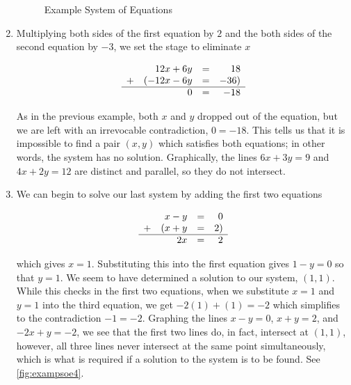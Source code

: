 \begin{ex}
\begin{enumerate}
\begin{figure}
\begin{center}
\begin{tabular}{m{0.5\linewidth}m{0.5\linewidth}}
\\

\end{tabular}

\caption{Example System of Equations}
\label{fig:exampsoe3}
\end{center}
\end{figure}

\item  Multiplying both sides of the first equation by $2$ and the both sides of the second equation by $-3$, we set the stage to eliminate $x$ 

\setlength{\extrarowheight}{2pt}
\[ \begin{array}{lrcr} & 12x + 6y & = & 18  \\ + & (-12x-6y  & = & -36 ) \\ \hline  & 0 & = & -18 \end{array}\] 
\setlength{\extrarowheight}{0pt}

As in the previous example, both $x$ and $y$ dropped out of the equation, but we are left with an irrevocable contradiction, $0 = -18$. This tells us that it is impossible to find a pair $(x,y)$ which satisfies both equations; in other words, the system has no solution.  Graphically, the lines  $6x + 3y =9$ and  $4x + 2y = 12$ are distinct and parallel, so they do not intersect.

\item  We can begin to solve our last system by adding the first two equations  

\setlength{\extrarowheight}{2pt}
\[ \begin{array}{lrcr} & x - y & = & 0  \\ + & (x + y & = & 2 ) \\ \hline  & 2x & = & 2 \end{array}\]  
\setlength{\extrarowheight}{0pt}

which gives $x = 1$.  Substituting this into the first equation gives $1 - y = 0$ so that $y = 1$.  We seem to have determined a solution to our system, $(1,1)$.  While this checks in the first two equations, when we substitute $x=1$ and $y=1$ into the third equation, we get $-2(1) + (1) = -2$ which simplifies to the contradiction $-1 = -2$.  Graphing the lines $x-y=0$, $x+y = 2$, and $-2x+y=-2$, we see that the first two lines do, in fact, intersect at $(1,1)$, however, all three lines never intersect at the same point simultaneously, which is what is required if a solution to the system is to be found. See \autoref{fig:exampsoe4}.


\end{enumerate}
\end{ex}
